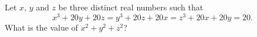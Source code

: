 Let $x$, $y$ and $z$ be three distinct real numbers such that
\[x^3+20y+20z=y^3+20z+20x=z^3+20x+20y=20 .\]
What is the value of $x^2+y^2+z^2$?

